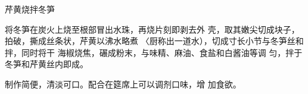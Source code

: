 \begin{recipe}{芹黄烧拌冬笋}

\ingredients


\cooking

将冬笋在炭火上烧至根部冒出水珠，再烧片刻即剥去外 壳，取其嫩尖切成块子，拍破，撕成丝条状，芹黄以沸水略煮 〈厨称出一道水），切成寸长小节与冬笋丝和拌，同时将干 海椒烧焦，碾成粉末，与味精、麻油、食盐和白酱油等调 匀，拌于冬笋和芹黄丝内即成。

\notes

制作简便，清淡可口。配合在筵席上可以调剂口味，增 加食欲。

\end{recipe}

